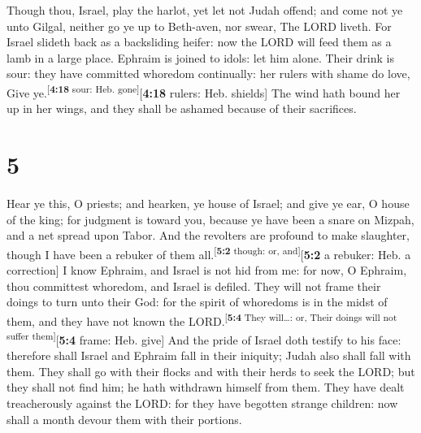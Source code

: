  Though thou, Israel, play the harlot, yet let not Judah
offend; and come not ye unto Gilgal, neither go ye up to Beth-aven, nor
swear, The LORD liveth.  For Israel slideth back as a
backsliding heifer: now the LORD will feed them as a lamb in a large
place.  Ephraim is joined to idols: let him alone.
 Their drink is sour: they have committed whoredom
continually: her rulers with shame do love, Give
ye.\textsuperscript{{[}\textbf{4:18} sour: Heb. gone{]}}{[}\textbf{4:18}
rulers: Heb. shields{]}  The wind hath bound her up in
her wings, and they shall be ashamed because of their sacrifices.

\hypertarget{section-4}{%
\section{5}\label{section-4}}

 Hear ye this, O priests; and hearken, ye house of Israel;
and give ye ear, O house of the king; for judgment is toward you,
because ye have been a snare on Mizpah, and a net spread upon Tabor.
 And the revolters are profound to make slaughter, though
I have been a rebuker of them all.\textsuperscript{{[}\textbf{5:2}
though: or, and{]}}{[}\textbf{5:2} a rebuker: Heb. a correction{]}
 I know Ephraim, and Israel is not hid from me: for now, O
Ephraim, thou committest whoredom, and Israel is defiled. 
They will not frame their doings to turn unto their God: for the spirit
of whoredoms is in the midst of them, and they have not known the
LORD.\textsuperscript{{[}\textbf{5:4} They will\ldots: or, Their doings
will not suffer them{]}}{[}\textbf{5:4} frame: Heb. give{]}
 And the pride of Israel doth testify to his face:
therefore shall Israel and Ephraim fall in their iniquity; Judah also
shall fall with them.  They shall go with their flocks and
with their herds to seek the LORD; but they shall not find him; he hath
withdrawn himself from them.  They have dealt
treacherously against the LORD: for they have begotten strange children:
now shall a month devour them with their portions.

